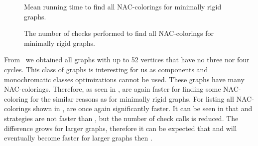 \begin{figure}[p]
	\centering
	\scalebox{0.5}{}
	\caption[Mean runtime for minimally rigid graphs (some).]{
		Mean running time to find all NAC-colorings for minimally rigid graphs.}%
	\label{fig:graph_minimally_rigid_first_runtime}
\end{figure}%
\begin{figure}[p]
	\centering
	\scalebox{0.5}{}
	\caption[Checks performed for minimally rigid graphs (some).]{
		The number of checks performed to find all NAC-colorings for minimally rigid graphs.}%
	\label{fig:graph_minimally_rigid_first_checks}
\end{figure}%


From~\cite{extremal_graphs} we obtained all graphs with up to 52 vertices
that have no three nor four cycles. This class of graphs is interesting for us
as \trcon{} components and monochromatic classes optimizations cannot be used.
These graphs have many NAC-colorings.
Therefore, as seen in ,
\NaiveCycles{} are again faster for finding some NAC-coloring
for the similar reasons as for minimally rigid graphs.
For listing all NAC-colorings shown in ,
\Subgraphs{} are once again significantly faster.
It can be seen in 
that \Neighbors{} and \CyclesMatchChunks{} strategies are not faster than \None{},
but the number of \IsNACColoring{} check calls is reduced.
The difference grows for larger graphs, therefore it can be expected
that \Neighbors{} and \CyclesMatchChunks{} will eventually become faster
for larger graphs then \None{}.

